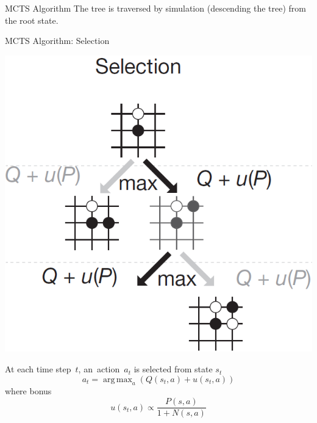 \documentclass{beamer}
\DeclareMathOperator*{\argmax}{arg\,max}
\begin{document}
{\begin{frame}{MCTS Algorithm}
      The tree is traversed by simulation (descending the tree) from the root state.
    \end{frame}

    \begin{frame}{MCTS Algorithm: Selection}
      \begin{center}
        \includegraphics[height=.6\textheight]{../img/MCTS_selection.png}
      \end{center}
      \pause

      \tiny
      At each time step~$t$, an~action~$a_t$ is selected from state $s_t$
      \[
        a_t = \argmax _a ( Q(s_t, a) + u(s_t, a) )
      \]
      \pause
      where bonus
      \[
        u(s_t, a) \propto \frac{P(s,a)}{1 + N(s,a)}
      \]
    \end{frame}

}
\end{document}
